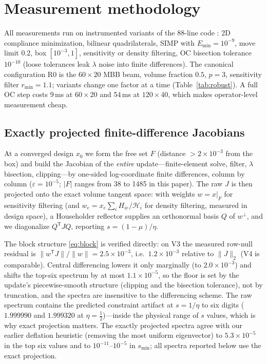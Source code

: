 \documentclass[11pt,a4paper]{article}
\newcommand{\smin}{s_{\min}}
\begin{document}
\section{Measurement methodology}\label{sec:method}

All measurements run on instrumented variants of the 88-line code
\citep{andreassen2011top88}: 2D compliance minimization, bilinear
quadrilaterals, SIMP with $E_{\min}=10^{-9}$, move limit $0.2$, box
$[10^{-3},1]$, sensitivity or density filtering, OC bisection tolerance
$10^{-10}$ (loose tolerances leak $\lambda$ noise into finite
differences). The canonical configuration R0 is the $60\times20$ MBB beam,
volume fraction $0.5$, $p=3$, sensitivity filter $r_{\min}=1.1$; variants
change one factor at a time (Table~\ref{tab:robust}). A full OC step costs
9\,ms at $60\times20$ and 54\,ms at $120\times40$, which makes
operator-level measurement cheap.

\subsection{Exactly projected finite-difference Jacobians}
\label{sec:jacobian}

At a converged design $x_0$ we form the free set $F$ (distance
$>2\times10^{-3}$ from the box) and build the Jacobian of the \emph{entire}
update---finite-element solve, filter, $\lambda$ bisection, clipping---by
one-sided log-coordinate finite differences, column by column
($\varepsilon=10^{-5}$; $|F|$ ranges from 38 to 1485 in this paper). The
raw $J$ is then projected onto the exact volume tangent space: with weights
$w=x|_F$ for sensitivity filtering (and $w_e=x_e\sum_i H_{ie}/\mathcal
H_i$ for density filtering, measured in design space), a Householder
reflector supplies an orthonormal basis $Q$ of $w^{\perp}$, and we
diagonalize $Q^{\mathsf T}JQ$, reporting $s=(1-\mu)/\eta$.

The block structure \eqref{eq:block} is verified directly: on V3 the
measured row-null residual is $\|w^{\mathsf T}J\|/\|w\|=2.5\times10^{-3}$,
i.e.\ $1.2\times10^{-3}$ relative to $\|J\|_2$ (V4 is comparable).
Central differencing lowers it only marginally (to $2.0\times10^{-3}$)
and shifts the top-six spectrum by at most $1.1\times10^{-5}$, so the
floor is set by the update's piecewise-smooth structure (clipping and the
bisection tolerance), not by truncation, and the spectra are insensitive
to the differencing scheme. The raw spectrum contains the predicted
constraint artifact at $s=1/\eta$ to six digits ($1.999990$ and
$1.999320$ at $\eta=\tfrac12$)---inside the physical range of $s$ values,
which is why exact projection matters. The exactly
projected spectra agree with our earlier deflation heuristic (removing the
most uniform eigenvector) to $5.3\times10^{-5}$ in the top six values and
to $10^{-11}$--$10^{-5}$ in $\smin$; all spectra reported below use the
exact projection.
\end{document}
